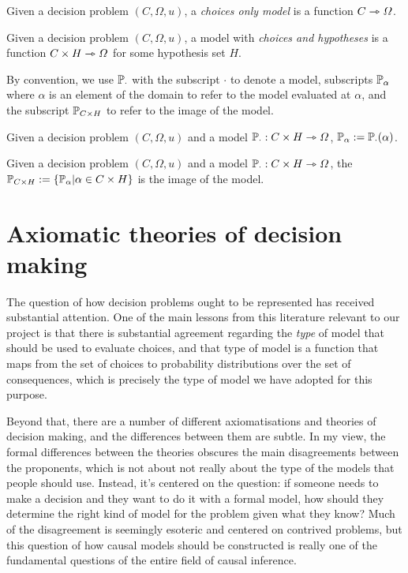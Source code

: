 \begin{definition}
Given a decision problem $(C,\Omega,u)$, a \emph{choices only model} is a function $C\rightarrowtriangle \Omega$.
\end{definition}

\begin{definition}
Given a decision problem $(C,\Omega,u)$, a model with \emph{choices and hypotheses} is a function $C\times H\rightarrowtriangle \Omega$ for some hypothesis set $H$.
\end{definition}

By convention, we use $\mathbb{P}_\cdot$ with the subscript $\cdot$ to denote a model, subscripts $\mathbb{P}_\alpha$ where $\alpha$ is an element of the domain to refer to the model evaluated at $\alpha$, and the subscript $\mathbb{P}_{C\times H}$ to refer to the image of the model.

\begin{notation}[Model]
Given a decision problem $(C,\Omega,u)$ and a model $\mathbb{P}_\cdot:C\times H\rightarrowtriangle \Omega$, $\mathbb{P}_\alpha:=\mathbb{P}_\cdot(\alpha)$.
\end{notation}

\begin{notation}\label{def:induced_pset_1}
Given a decision problem $(C,\Omega,u)$ and a model $\mathbb{P}_\cdot:C\times H\rightarrowtriangle \Omega$, the $\mathbb{P}_{C\times H}:=\{\mathbb{P}_\alpha|\alpha\in C\times H\}$ is the image of the model.
\end{notation}


\section{Axiomatic theories of decision making}\label{sec:how_represent_conseqeunces}

The question of how decision problems ought to be represented has received substantial attention. One of the main lessons from this literature relevant to our project is that there is substantial agreement regarding the \emph{type} of model that should be used to evaluate choices, and that type of model is a function that maps from the set of choices to probability distributions over the set of consequences, which is precisely the type of model we have adopted for this purpose.

Beyond that, there are a number of different axiomatisations and theories of decision making, and the differences between them are subtle. In my view, the formal differences between the theories obscures the main disagreements between the proponents, which is not about not really about the type of the models that people should use. Instead, it's centered on the question: if someone needs to make a decision and they want to do it with a formal model, how should they determine the right kind of model for the problem given what they know? Much of the disagreement is seemingly esoteric and centered on contrived problems, but this question of how causal models should be constructed is really one of the fundamental questions of the entire field of causal inference. 

